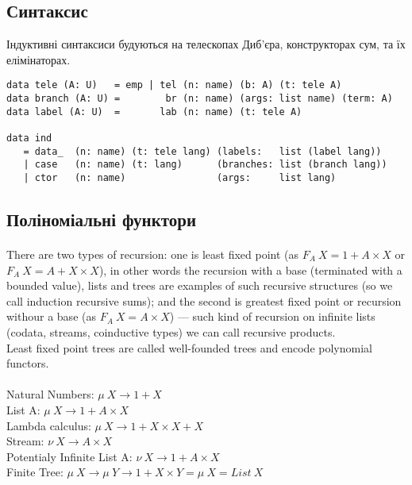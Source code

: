 \subsection{Синтаксис}

Індуктивні синтаксиси будуються на телескопах Диб'єра,
конструкторах сум, та їх елімінаторах.

\begin{lstlisting}[mathescape=true]
data tele (A: U)   = emp | tel (n: name) (b: A) (t: tele A)
data branch (A: U) =        br (n: name) (args: list name) (term: A)
data label (A: U)  =       lab (n: name) (t: tele A)

data ind
   = data_  (n: name) (t: tele lang) (labels:   list (label lang))
   | case   (n: name) (t: lang)      (branches: list (branch lang))
   | ctor   (n: name)                (args:     list lang)
\end{lstlisting}

\newpage
  \subsection{Поліноміальні функтори}

  \paragraph{}
  There are two types of recursion: one is least fixed point (as $F_A\ X = 1 + A\times X$
  or $F_A\ X = A + X\times X$), in other words the recursion with a base (terminated with a bounded value),
  lists and trees are examples of such recursive structures (so we call induction recursive sums);
  and the second is greatest fixed point or recursion withour a base (as $F_A\ X = A\times X $) ---
  such kind of recursion on infinite lists (codata, streams, coinductive types) we can call recursive products.\\
  Least fixed point trees are called well-founded trees and encode polynomial functors.

  \paragraph{}
  Natural Numbers: $\mu\ X \rightarrow 1 + X$\\
  List A: $\mu\ X \rightarrow 1 + A \times X$\\
  Lambda calculus: $\mu\ X \rightarrow 1 + X \times X + X$\\
  Stream: $\nu\ X \rightarrow A \times X$\\
  Potentialy Infinite List A: $\nu\ X \rightarrow 1 + A \times X$\\
  Finite Tree: $\mu\ X \rightarrow \mu\ Y \rightarrow 1 + X \times Y = \mu\ X = List\ X$\\

